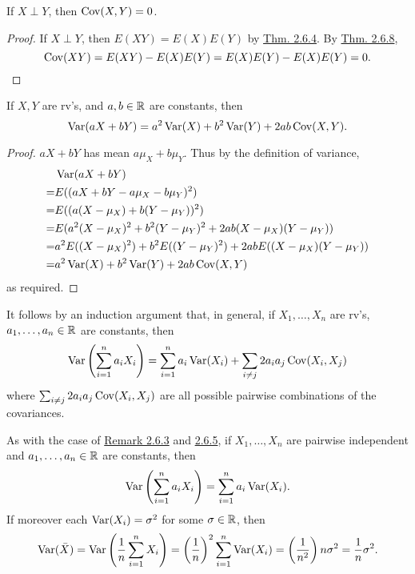 \documentclass[11pt,fleqn]{book} %
\begin{document}
\begin{corollary} \label{cor:269}
If \(X \perp Y\), then \(\operatorname{Cov}(X, Y) = 0\).
\end{corollary}
\begin{proof} If \(X \perp Y\), then \(E(XY) = E(X)E(Y)\) by \hyperref[thm:264]{Thm. 2.6.4}. By \hyperref[thm:268]{Thm. 2.6.8}, 
\[
\operatorname{Cov}(XY) = E(XY) - E(X)E(Y) = E(X)E(Y) - E(X)E(Y) = 0.
\]
\end{proof}

\begin{theorem} If \(X, Y\) are rv's, and \(a, b \in \mathbb{R}\) are constants, then
\[
\operatorname{Var}(aX + bY) = a^2\operatorname{Var}(X) + b^2\operatorname{Var}(Y) + 2ab\operatorname{Cov}(X, Y).
\]
\end{theorem}
\begin{proof} \(aX + bY\) has mean \(a\mu_X + b\mu_Y\). Thus by the definition of variance,
\[
\begin{aligned}
&\operatorname{Var}(aX + bY) \\
= &E((aX + bY - a\mu_X - b\mu_Y)^2) \\
= &E((a(X - \mu_X) + b(Y - \mu_Y))^2) \\
= &E(a^2(X - \mu_X)^2 + b^2(Y - \mu_Y)^2 + 2ab(X - \mu_X)(Y - \mu_Y)) \\
= &a^2E((X - \mu_X)^2) + b^2E((Y - \mu_Y)^2) + 2abE((X - \mu_X)(Y - \mu_Y)) \\
= &a^2\operatorname{Var}(X) + b^2\operatorname{Var}(Y) + 2ab\operatorname{Cov}(X, Y)
\end{aligned}
\]
as required.
\end{proof}

\begin{remark} It follows by an induction argument that, in general, if \(X_1, \ldots, X_n\) are rv's, \(a_1, \ldots, a_n \in \mathbb{R}\) are constants, then
\[
\operatorname{Var}\left(\sum_{i=1}^n a_iX_i\right) = \sum_{i=1}^n a_i\operatorname{Var}(X_i) + \sum_{i \neq j}2a_ia_j\operatorname{Cov}(X_i, X_j)
\]
where \(\sum_{i\neq j} 2a_ia_j\operatorname{Cov}(X_i, X_j)\) are all possible pairwise combinations of the covariances.
\end{remark}

\begin{remark} As with the case of \hyperref[rmk:263]{Remark 2.6.3} and \hyperref[rmk:265]{2.6.5}, if \(X_1, \ldots, X_n\) are pairwise independent and \(a_1, \ldots, a_n \in \mathbb{R}\) are constants, then
\[
\operatorname{Var}\left(\sum_{i=1}^n a_iX_i\right) = \sum_{i=1}^n a_i\operatorname{Var}(X_i).
\]
\indent If moreover each \(\operatorname{Var}(X_i) = \sigma^2\) for some \(\sigma\in\mathbb{R}\), then
\[
\operatorname{Var}(\bar{X}) = \operatorname{Var}\left(\frac1n\sum_{i=1}^nX_i\right) = \left(\frac1n\right)^2\sum_{i=1}^n\operatorname{Var}(X_i) = \left(\frac1{n^2}\right)n\sigma^2 = \frac1n \sigma^2.
\]
\end{remark}
\end{document}
